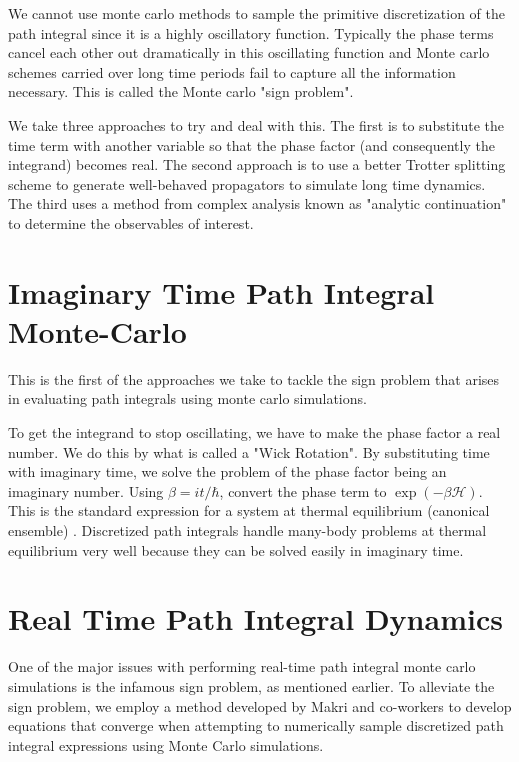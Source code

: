 We cannot use monte carlo methods to sample the primitive discretization of the path integral since it is a highly oscillatory function. Typically the phase terms cancel each other out dramatically in this oscillating function and Monte carlo schemes carried over long time periods fail to capture all the information necessary. This is called the Monte carlo "sign problem".

We take three approaches to try and deal with this. The first is to substitute the time term with another variable so that the phase factor (and consequently the integrand) becomes real. The second approach is to use a better Trotter splitting scheme to generate well-behaved propagators to simulate long time dynamics. The third uses a method from complex analysis known as "analytic continuation" to determine the observables of interest.

\section{Imaginary Time Path Integral Monte-Carlo}

This is the first of the approaches we take to tackle the sign problem that arises in evaluating path integrals using monte carlo simulations. 

To get the integrand to stop oscillating, we have to make the phase factor a real number. We do this by what is called a "Wick Rotation". By substituting time with imaginary time, we solve the problem of the phase factor being an imaginary number. Using $\beta = it/\hbar$, convert the phase term to $\exp(-\beta \mathcal{H})$. This is the standard expression for a system at thermal equilibrium (canonical ensemble) \cite{tuckerman2023statistical}. Discretized path integrals handle many-body problems at thermal equilibrium very well because they can be solved easily in imaginary time.

\section{Real Time Path Integral Dynamics}

One of the major issues with performing real-time path integral monte carlo simulations is the infamous sign problem, as mentioned earlier. 
To alleviate the sign problem, we employ a method developed by Makri and co-workers \cite{quapi} to develop equations that converge when attempting to numerically sample discretized path integral expressions using Monte Carlo simulations.

